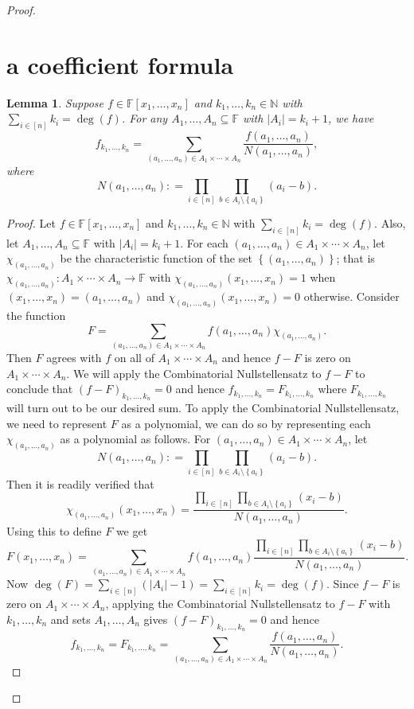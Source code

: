 \documentclass{amsbook}
\theoremstyle{plain}
\newtheorem{lemma}{Lemma}
\numberwithin{equation}{chapter}
\newcommand{\set}[1]{\left\{ #1 \right\}}
\newcommand{\card}[1]{\left|#1\right|}
\newcommand{\func}[3]{#1\colon #2 \rightarrow #3}
\newcommand{\irange}[1]{\left[#1\right]}
\newcommand{\DefinedAs}{\mathrel{\mathop:}=}
\newcommand{\IN}{\mathbb{N}}
\begin{document}
\begin{proof}
\section*{a coefficient formula}
\begin{lemma}
Suppose $f \in \mathbb{F}[x_1, \ldots, x_n]$ and $k_1, \ldots, k_n \in \IN$ with $\sum_{i \in \irange{n}} k_i = \deg(f)$.  For any $A_1, \ldots, A_n \subseteq \mathbb{F}$ with $\card{A_i} = k_i + 1$, we have
\[f_{k_1, \ldots, k_n} = \sum_{(a_1, \ldots, a_n) \in A_1 \times \cdots \times A_n} \frac{f(a_1, \ldots, a_n)}{N(a_1, \ldots, a_n)},\]
where
\[N(a_1, \ldots, a_n) \DefinedAs \prod_{i \in \irange{n}} \prod_{b \in A_i \setminus \set{a_i}} (a_i - b).\]
\end{lemma}
\begin{proof}
Let $f \in \mathbb{F}[x_1, \ldots, x_n]$ and $k_1, \ldots, k_n \in \IN$ with $\sum_{i \in \irange{n}} k_i = \deg(f)$. Also, let $A_1, \ldots, A_n \subseteq \mathbb{F}$ with $\card{A_i} = k_i + 1$.  For each $(a_1, \ldots, a_n) \in A_1 \times \cdots \times A_n$, let $\chi_{(a_1, \ldots, a_n)}$ be the characteristic function of the set $\set{(a_1, \ldots, a_n)}$; that is $\func{\chi_{(a_1, \ldots, a_n)}}{A_1 \times \cdots \times A_n}{\mathbb{F}}$ with $\chi_{(a_1, \ldots, a_n)}(x_1, \ldots, x_n) = 1$ when $(x_1, \ldots, x_n) = (a_1, \ldots, a_n)$ and $\chi_{(a_1, \ldots, a_n)}(x_1, \ldots, x_n) = 0$ otherwise.  Consider the function
\[F = \sum_{(a_1, \ldots, a_n) \in A_1 \times \cdots \times A_n} f(a_1, \ldots, a_n)\chi_{(a_1, \ldots, a_n)}.\]
Then $F$ agrees with $f$ on all of $A_1 \times \cdots \times A_n$ and hence $f - F$ is zero on $A_1 \times \cdots \times A_n$.  We will apply the Combinatorial Nullstellensatz to $f - F$ to conclude that $(f-F)_{k_1, \ldots, k_n} = 0$ and hence $f_{k_1, \ldots, k_n} = F_{k_1, \ldots, k_n}$ where  $F_{k_1, \ldots, k_n}$ will turn out to be our desired sum.  To apply the Combinatorial Nullstellensatz, we need to represent $F$ as a polynomial, we can do so by representing each $\chi_{(a_1, \ldots, a_n)}$ as a polynomial as follows.  For $(a_1, \ldots, a_n) \in A_1 \times \cdots \times A_n$, let 
\[N(a_1, \ldots, a_n) \DefinedAs \prod_{i \in \irange{n}} \prod_{b \in A_i \setminus \set{a_i}} (a_i - b).\]
\noindent Then it is readily verified that
\[\chi_{(a_1, \ldots, a_n)}(x_1, \ldots, x_n) = \frac{\prod_{i \in \irange{n}} \prod_{b \in A_i \setminus \set{a_i}} (x_i - b)}{N(a_1, \ldots, a_n)}.\]
\noindent Using this to define $F$ we get 
\[F(x_1, \ldots, x_n) = \sum_{(a_1, \ldots, a_n) \in A_1 \times \cdots \times A_n} f(a_1, \ldots, a_n)\frac{\prod_{i \in \irange{n}} \prod_{b \in A_i \setminus \set{a_i}} (x_i - b)}{N(a_1, \ldots, a_n)}.\]
Now  $\deg(F) = \sum_{i \in \irange{n}} (|A_i| - 1) = \sum_{i \in \irange{n}} k_i = \deg(f)$.  Since $f - F$ is zero on $A_1 \times \cdots \times A_n$, applying the Combinatorial Nullstellensatz to $f - F$ with $k_1, \ldots, k_n$ and sets $A_1, \ldots, A_n$ gives $(f-F)_{k_1, \ldots, k_n} = 0$ and hence 
\[f_{k_1, \ldots, k_n} = F_{k_1, \ldots, k_n} = \sum_{(a_1, \ldots, a_n) \in A_1 \times \cdots \times A_n} \frac{f(a_1, \ldots, a_n)}{N(a_1, \ldots, a_n)}.\]
\end{proof}


\end{proof}
\end{document}

